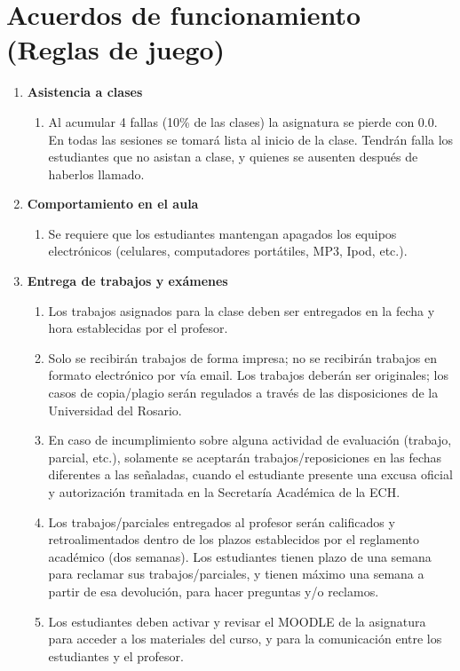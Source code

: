 \documentclass[letterpaper]{article}
\begin{document}
\section{Acuerdos de funcionamiento (Reglas de juego) }
\begin{enumerate}

	\item  {\bf Asistencia a clases} 
	\begin{enumerate}


\item Al acumular 4 fallas (10\% de las clases) la asignatura se pierde con 0.0. En todas las sesiones se
tomará lista al inicio de la clase. Tendrán falla los estudiantes que no asistan a clase, y quienes
se ausenten después de haberlos llamado.
	\end{enumerate}
	
	\item  {\bf Comportamiento en el aula} 
	\begin{enumerate}
		
\item Se requiere que los estudiantes mantengan apagados los equipos electrónicos (celulares,
computadores portátiles, MP3, Ipod, etc.).
	\end{enumerate}

	\item  {\bf Entrega de trabajos y exámenes} 
	\begin{enumerate}


\item Los trabajos asignados para la clase deben ser entregados en la fecha y hora establecidas por el
profesor.
\item Solo se recibirán trabajos de forma impresa; no se recibirán trabajos en formato electrónico por
vía email.
Los trabajos deberán ser originales; los casos de copia/plagio serán regulados a través de las
disposiciones de la Universidad del Rosario.
\item En caso de incumplimiento sobre alguna actividad de evaluación (trabajo, parcial, etc.),
solamente se aceptarán trabajos/reposiciones en las fechas diferentes a las señaladas, cuando el estudiante presente una excusa oficial y autorización tramitada en la Secretaría Académica de la ECH.
\item Los trabajos/parciales entregados al profesor serán calificados y retroalimentados dentro de los
plazos establecidos por el reglamento académico (dos semanas).
Los estudiantes tienen plazo de una semana para reclamar sus trabajos/parciales, y tienen
máximo una semana a partir de esa devolución, para hacer preguntas y/o reclamos.
\item Los estudiantes deben activar y revisar el MOODLE de la asignatura para acceder a los
materiales del curso, y para la comunicación entre los estudiantes y el profesor.
	\end{enumerate}
\end{enumerate}
\end{document}
